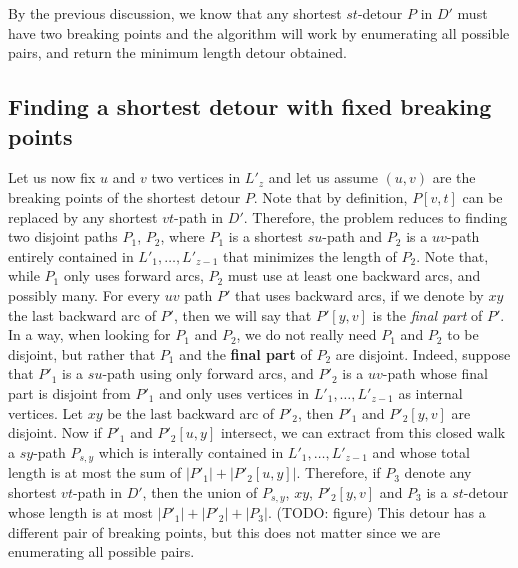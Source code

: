\documentclass[utf8,11pt]{article}
\theoremstyle{plain}
\theoremstyle{definition}
\begin{document}
By the previous discussion, we know that any shortest $st$-detour $P$ in $D'$ must have two breaking points and the algorithm will work by enumerating all possible pairs, and return the minimum length detour obtained.

\subsection*{Finding a shortest detour with fixed breaking points}

Let us now fix $u$ and $v$ two vertices in $L'_z$ and let us assume $(u,v)$ are the breaking points of the shortest detour $P$. Note that by definition, $P[v,t]$ can be replaced by any shortest $vt$-path in $D'$. Therefore, the problem reduces to finding two disjoint paths $P_1$, $P_2$, where $P_1$ is a shortest $su$-path and $P_2$ is a $uv$-path entirely contained in $L'_1, \dots, L'_{z-1}$ that minimizes the length of $P_2$. Note that, while $P_1$ only uses forward arcs, $P_2$ must use at least one backward arcs, and possibly many. For every $uv$ path $P'$ that uses backward arcs, if we denote by $xy$ the last backward arc of $P'$, then we will say that $P'[y,v]$ is the \textit{final part} of $P'$. In a way, when looking for $P_1$ and $P_2$, we do not really need $P_1$ and $P_2$ to be disjoint, but rather that $P_1$ and the \textbf{final part} of $P_2$ are disjoint. Indeed, suppose that $P'_1$ is a $su$-path using only forward arcs, and $P'_2$ is a $uv$-path whose final part is disjoint from $P'_1$ and only uses vertices in $L'_1, \dots, L'_{z-1}$ as internal vertices. Let $xy$ be the last backward arc of $P'_2$, then $P'_1$ and $P'_2[y,v]$ are disjoint. Now if $P'_1$ and $P'_2[u,y]$ intersect, we can extract from this closed walk a $sy$-path $P_{s,y}$ which is interally contained in $L'_1, \dots, L'_{z-1}$ and whose total length is at most the sum of $|P'_1| + |P'_2[u,y]|$. Therefore, if $P_3$ denote any shortest $vt$-path in $D'$, then the union of $P_{s,y}$, $xy$, $P'_2[y,v]$ and $P_3$ is a $st$-detour whose length is at most $|P'_1| + |P'_2| + |P_3|$. (TODO: figure) This detour has a different pair of breaking points, but this does not matter since we are enumerating all possible pairs.

\end{document}
